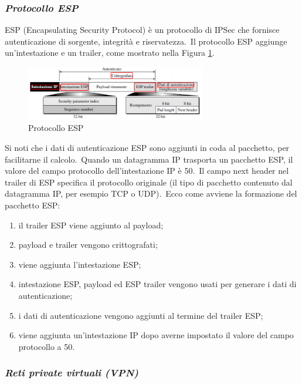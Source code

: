 \subsubsection{\textit{Protocollo ESP}}

ESP (Encapsulating Security Protocol) è un protocollo di IPSec che fornisce autenticazione di sorgente, integrità e riservatezza.\
Il protocollo ESP aggiunge un'intestazione e un trailer, come mostrato nella Figura \ref{fig:ESP}.

\begin{figure}[H]
    \centering
    \includegraphics[width=0.7\textwidth]{immagini/ESP.png}
    \caption{Protocollo ESP}
    \label{fig:ESP}
\end{figure}

Si noti che i dati di autenticazione ESP sono aggiunti in coda al pacchetto, per facilitarne il calcolo.\
Quando un datagramma IP trasporta un pacchetto ESP, il valore del campo protocollo dell'intestazione IP è 50.\
Il campo next header nel trailer di ESP specifica il protocollo originale (il tipo di pacchetto contenuto dal datagramma IP, per esempio TCP o UDP).\
Ecco come avviene la formazione del pacchetto ESP:

\begin{enumerate}
    \item il trailer ESP viene aggiunto al payload;
    \item payload e trailer vengono crittografati;
    \item viene aggiunta l'intestazione ESP;
    \item intestazione ESP, payload ed ESP trailer vengono usati per generare i dati di autenticazione;
    \item i dati di autenticazione vengono aggiunti al termine del trailer ESP;
    \item viene aggiunta un'intestazione IP dopo averne impostato il valore del campo protocollo a 50.
\end{enumerate}

\subsubsection{\textit{Reti private virtuali (VPN)}}

